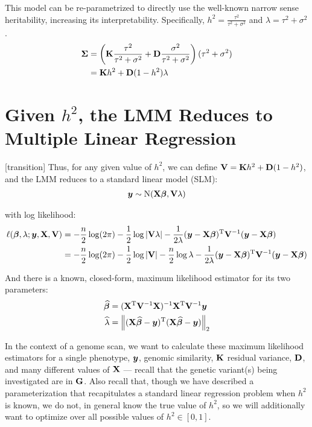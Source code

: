 This model can be re-parametrized to directly use the well-known narrow sense heritability, increasing its interpretability.
Specifically, $h^2 = \frac{\tau^2}{\tau^2 + \sigma^2}$ and $\lambda = \tau^2 + \sigma^2$.
\begin{align}
  \mathbf{\Sigma} &= \left(\mathbf{K} \frac{\tau^2}{\tau^2 + \sigma^2} + \mathbf{D} \frac{\sigma^2}{\tau^2 + \sigma^2}\right) (\tau^2 + \sigma^2)\\
      &= \mathbf{K} h^2 + \mathbf{D} (1 - h^2) \lambda
\end{align}


\section{Given \texorpdfstring{$h^2$}{h-squared}, the LMM Reduces to Multiple Linear Regression}

[transition]
Thus, for any given value of $h^2$, we can define $\mathbf{V} = \mathbf{K} h^2 + \mathbf{D} (1 - h^2)$, and the LMM reduces to a standard linear model (SLM):
\begin{align}
    \bm{y} \sim \mathrm{N}(\mathbf{X}\boldsymbol{\beta}, \mathbf{V} \lambda)     \label{eq:gls}
\end{align}

with log likelihood:
\begin{align}
    \ell(\boldsymbol{\beta}, \lambda; \bm{y}, \mathbf{X}, \mathbf{V}) &= 
        -\frac{n}{2}\log(2\pi)
        -\frac{1}{2}\log|\mathbf{V}\lambda|
        -           \frac{1}{2\lambda}
            (\bm{y}-\mathbf{X}\boldsymbol{\beta})^\mathrm{T}\mathbf{V}^{-1}(\bm{y}-\mathbf{X}\boldsymbol{\beta}) \\
    &= 
        -\frac{n}{2}\log(2\pi)
        -\frac{1}{2}\log|\mathbf{V}|
        -\frac{n}{2}\log\lambda
        - \frac{1}{2\lambda}
            (\bm{y}-\mathbf{X}\boldsymbol{\beta})^\mathrm{T}\mathbf{V}^{-1}(\bm{y}-\mathbf{X}\boldsymbol{\beta})
\end{align}

And there is a known, closed-form, maximum likelihood estimator for its two parameters:
\begin{align}
	\widehat{\boldsymbol{\beta}}    &= (\mathbf{X} ^\mathrm{T} \mathbf{V} ^{-1} \mathbf{X}) ^{-1} \mathbf{X} ^\mathrm{T} \mathbf{V} ^{-1} \bm{y}\\
    \widehat{\lambda}   &= \left\lVert(\mathbf{X}\widehat{\boldsymbol{\beta}} - \bm{y})^\mathrm{T}(\mathbf{X}\widehat{\boldsymbol{\beta}} - \bm{y})\right\rVert_{2}
\end{align}

In the context of a genome scan, we want to calculate these maximum likelihood estimators for a single phenotype, $\bm{y}$, genomic similarity, $\mathbf{K}$ residual variance, $\mathbf{D}$, and many different values of $\mathbf{X}$ --- recall that the genetic variant(s) being investigated are in $\mathbf{G}$.
Also recall that, though we have described a parameterization that recapitulates a standard linear regression problem when $h^2$ is known, we do not, in general know the true value of $h^2$, so we will additionally want to optimize over all possible values of $h^2 \in [0, 1]$.


